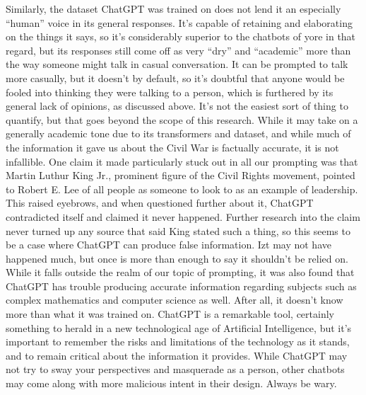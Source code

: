 \documentclass[letterpaper, 10 pt, conference]{ieeeconf}  %
\begin{document}
	Similarly, the dataset ChatGPT was trained on does not lend it an especially “human” voice in its general responses. It’s capable of retaining and elaborating on the things it says, so it’s considerably superior to the chatbots of yore in that regard, but its responses still come off as very “dry” and “academic” more than the way someone might talk in casual conversation. It can be prompted to talk more casually, but it doesn’t by default, so it’s doubtful that anyone would be fooled into thinking they were talking to a person, which is furthered by its general lack of opinions, as discussed above. It’s not the easiest sort of thing to quantify, but that goes beyond the scope of this research.
	While it may take on a generally academic tone due to its transformers and dataset, and while much of the information it gave us about the Civil War is factually accurate, it is not infallible. One claim it made particularly stuck out in all our prompting was that Martin Luthur King Jr., prominent figure of the Civil Rights movement, pointed to Robert E. Lee of all people as someone to look to as an example of leadership. This raised eyebrows, and when questioned further about it, ChatGPT contradicted itself and claimed it never happened. Further research into the claim never turned up any source that said King stated such a thing, so this seems to be a case where ChatGPT can produce false information. Izt may not have happened much, but once is more than enough to say it shouldn’t be relied on. While it falls outside the realm of our topic of prompting, it was also found that ChatGPT has trouble producing accurate information regarding subjects such as complex mathematics and computer science as well. After all, it doesn’t know more than what it was trained on.
	ChatGPT is a remarkable tool, certainly something to herald in a new technological age of Artificial Intelligence, but it’s important to remember the risks and limitations of the technology as it stands, and to remain critical about the information it provides. While ChatGPT may not try to sway your perspectives and masquerade as a person, other chatbots may come along with more malicious intent in their design. Always be wary.


\addtolength{\textheight}{-12cm}   %
\end{document}
